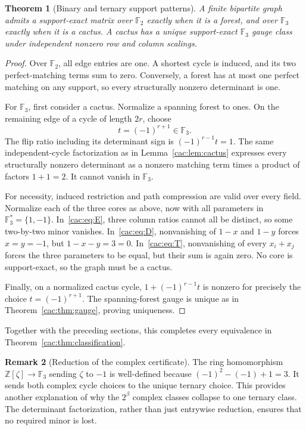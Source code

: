 \documentclass[11pt]{article}
\numberwithin{equation}{section}
\newtheorem{theorem}{Theorem}[section]
\theoremstyle{definition}
\newtheorem{remark}[theorem]{Remark}
\newcommand{\Z}{\mathbb Z}
\newcommand{\F}{\mathbb F}
\begin{document}
\begin{theorem}[Binary and ternary support patterns]
\label{cac:thm:fields}
A finite bipartite graph admits a support-exact matrix over $\F_2$ exactly when it is a forest, and over $\F_3$ exactly when it is a cactus. A cactus has a unique support-exact $\F_3$ gauge class under independent nonzero row and column scalings.
\end{theorem}
\begin{proof}
Over $\F_2$, all edge entries are one. A shortest cycle is induced, and its two perfect-matching terms sum to zero. Conversely, a forest has at most one perfect matching on any support, so every structurally nonzero determinant is one.

For $\F_3$, first consider a cactus. Normalize a spanning forest to ones. On the remaining edge of a cycle of length $2r$, choose
\[
 t=(-1)^{r+1}\in\F_3.
\]
The flip ratio including its determinant sign is $(-1)^{r-1}t=1$. The same independent-cycle factorization as in Lemma~\ref{cac:lem:cactus} expresses every structurally nonzero determinant as a nonzero matching term times a product of factors $1+1=2$. It cannot vanish in $\F_3$.

For necessity, induced restriction and path compression are valid over every field. Normalize each of the three cores as above, now with all parameters in $\F_3^*=\{1,-1\}$. In~\eqref{cac:eq:E}, three column ratios cannot all be distinct, so some two-by-two minor vanishes. In~\eqref{cac:eq:D}, nonvanishing of $1-x$ and $1-y$ forces $x=y=-1$, but $1-x-y=3=0$. In~\eqref{cac:eq:T}, nonvanishing of every $x_i+x_j$ forces the three parameters to be equal, but their sum is again zero. No core is support-exact, so the graph must be a cactus.

Finally, on a normalized cactus cycle, $1+(-1)^{r-1}t$ is nonzero for precisely the choice $t=(-1)^{r+1}$. The spanning-forest gauge is unique as in Theorem~\ref{cac:thm:gauge}, proving uniqueness.
\end{proof}

Together with the preceding sections, this completes every equivalence in Theorem~\ref{cac:thm:classification}.

\begin{remark}[Reduction of the complex certificate]
The ring homomorphism $\Z[\zeta]\to\F_3$ sending $\zeta$ to $-1$ is well-defined because $(-1)^2-(-1)+1=3$. It sends both complex cycle choices to the unique ternary choice. This provides another explanation of why the $2^{\beta}$ complex classes collapse to one ternary class. The determinant factorization, rather than just entrywise reduction, ensures that no required minor is lost.
\end{remark}
\end{document}
